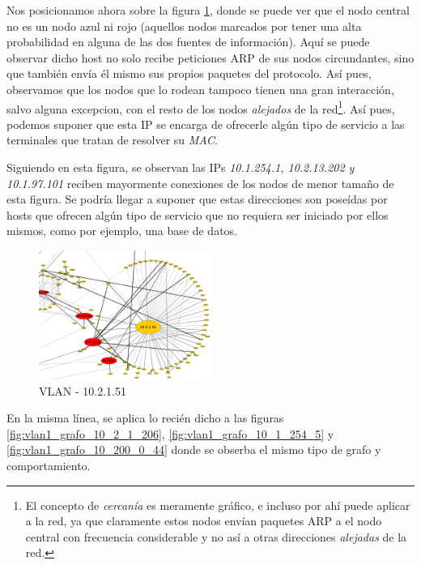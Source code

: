 \par Nos posicionamos ahora sobre la figura \ref{fig:vlan1_grafo_10_2_1_51}, donde se puede
ver que el nodo central no es un nodo azul ni rojo (aquellos nodos marcados por tener una
alta probabilidad en alguna de las dos fuentes de informaci\'on). Aqu\'i se puede observar dicho
host no solo recibe peticiones ARP de sus nodos circundantes, sino que tambi\'en env\'ia \'el
mismo sus propios paquetes del protocolo. As\'i pues, observamos que los nodos que lo rodean
tampoco tienen una gran interacci\'on, salvo alguna excepcion, con el resto de los nodos
\textit{alejados} de la red\footnote{El concepto de \textit{cercan\'ia} es meramente gr\'afico,
e incluso por ah\'i puede aplicar a la red, ya que claramente estos nodos env\'ian paquetes
ARP a el nodo central con frecuencia considerable y no as\'i a otras direcciones \textit{alejadas}
de la red.}. As\'i pues, podemos suponer que esta IP se encarga de ofrecerle alg\'un tipo
de servicio a las terminales que tratan de resolver su \textit{MAC}.

\par Siguiendo en esta figura, se observan las IPs \textit{10.1.254.1, 10.2.13.202 y
10.1.97.101} reciben mayormente conexiones de los nodos de menor tama\~no de esta figura.
Se podr\'ia llegar a suponer que estas direcciones son pose\'idas por hosts que ofrecen
alg\'un tipo de servicio que no requiera ser iniciado por ellos mismos, como por ejemplo,
una base de datos.

\begin{figure}[!htb]
    \centering
    \includegraphics[width=0.5\textwidth]{img/graph/escenario_1/vlan1/vlan1_1000toEnd_10_2_1_51}
    \caption{VLAN  - 10.2.1.51}
    \label{fig:vlan1_grafo_10_2_1_51}
\end{figure}

\par En la misma l\'inea, se aplica lo reci\'en dicho a las figuras \ref{fig:vlan1_grafo_10_2_1_206},
\ref{fig:vlan1_grafo_10_1_254_5} y \ref{fig:vlan1_grafo_10_200_0_44} donde se obserba
el mismo tipo de grafo y comportamiento.

